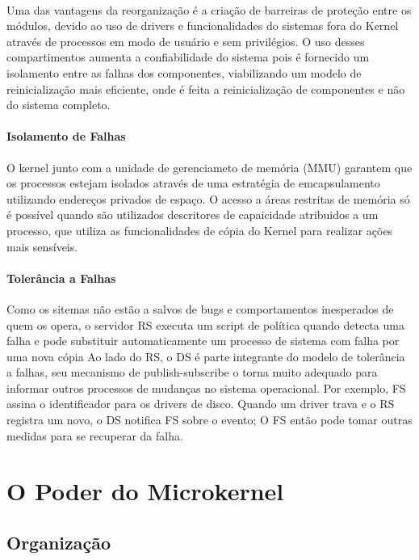 \documentclass[runningheads]{llncs}
\begin{document}
\paragraph*{}Uma das vantagens da reorganização é a criação de barreiras de proteção entre os módulos, devido ao uso de drivers e funcionalidades do sistemas fora do Kernel através de processos em modo de usuário e sem privilégios.
O uso desses compartimentos aumenta a confiabilidade do sistema pois é fornecido um isolamento entre as falhas dos componentes, viabilizando um modelo de reinicialização mais eficiente, onde é feita a reinicialização de componentes e não do sistema completo.

\paragraph*{Isolamento de Falhas}O kernel junto com a unidade de gerenciameto de memória (MMU) garantem que os processos estejam isolados através de uma estratégia de emcapsulamento utilizando endereços privados de espaço. O acesso a áreas
restritas de memória só é possível quando são utilizados descritores de capaicidade atribuidos a um processo, que utiliza as funcionalidades de cópia do Kernel para realizar ações mais sensíveis.

\paragraph*{Tolerância a Falhas}Como os sitemas não estão a salvos de bugs e comportamentos inesperados de quem os opera, o servidor RS executa um script de política quando detecta uma falha e
pode substituir automaticamente um processo de sistema com falha por uma nova cópia Ao lado do RS, o DS é parte integrante do modelo de tolerância a falhas, seu mecanismo de publish-subscribe o torna muito adequado para informar outros processos de mudanças no sistema operacional. Por exemplo, FS assina o identificador para os drivers de disco. Quando um driver trava e o RS registra um novo, o DS notifica FS sobre o evento; O FS então pode tomar outras medidas para se recuperar da falha.

\section{ O Poder do Microkernel }
\subsection{Organização}
\end{document}
